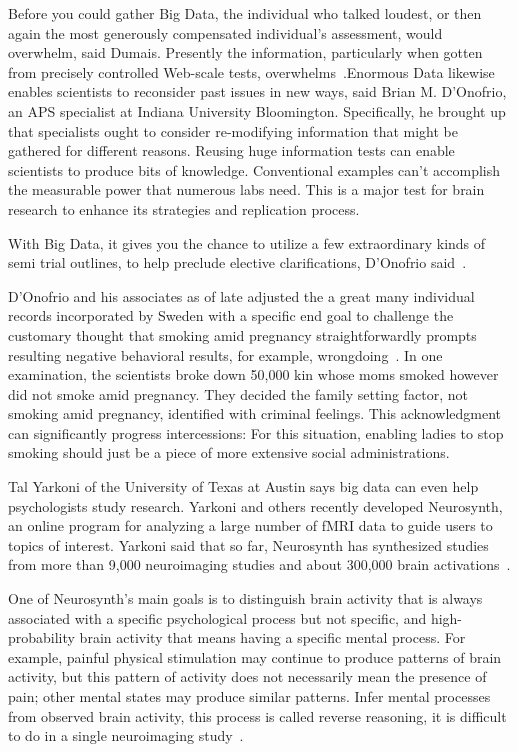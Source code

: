 Before you could gather Big Data, the individual who talked 
loudest, or then again the most generously compensated individual's
 assessment, would overwhelm, said Dumais. Presently the 
information, particularly when gotten from precisely controlled
 Web-scale tests, overwhelms~\cite{editor00}.Enormous Data likewise
 enables scientists to reconsider past issues in new ways, said 
Brian M. D'Onofrio, an APS specialist at Indiana University 
Bloomington. Specifically, he brought up that specialists ought to
 consider re-modifying information that might be gathered for 
different reasons. Reusing huge information tests can enable 
scientists to produce bits of knowledge. Conventional examples 
can't accomplish the measurable power that numerous labs need. 
This is a major test for brain research to enhance its strategies 
and replication process.

With Big Data, it gives you the chance to utilize a few 
extraordinary 
kinds of semi trial outlines, to help preclude elective 
clarifications, D'Onofrio said~\cite{editor00}.

D'Onofrio and his associates as of late adjusted the a great many 
individual records incorporated by Sweden with a specific end goal 
to challenge the customary 
thought that smoking amid pregnancy straightforwardly prompts 
resulting negative 
behavioral results, for example, wrongdoing~\cite{editor00}. 
In one examination, the scientists broke down 
50,000 kin whose moms smoked however did not smoke amid pregnancy. 
They decided the family setting factor, not smoking amid pregnancy,
identified with criminal feelings. This acknowledgment can 
significantly progress intercessions: 
For this situation, enabling ladies to stop smoking should just be
 a piece of more extensive social administrations.

Tal Yarkoni of the University of Texas at Austin says big data can 
even help psychologists study research. Yarkoni and others recently 
developed Neurosynth, an online program for analyzing a large number 
of fMRI data to guide users to topics of interest. Yarkoni said that 
so far, Neurosynth has synthesized studies from more than 9,000 
neuroimaging studies and about 300,000 brain activations~\cite{editor00}.

One of Neurosynth's main goals is to distinguish brain activity that 
is always associated with a specific psychological process but not 
specific, and high-probability brain activity that means having a 
specific mental process. For example, painful physical stimulation 
may continue to produce patterns of brain activity, but this 
pattern 
of activity does not necessarily mean the presence of pain; other 
mental states may produce similar patterns. Infer mental processes 
from observed brain activity, this process is called reverse 
reasoning, it is difficult to do in a single neuroimaging 
study~\cite{editor00}.

